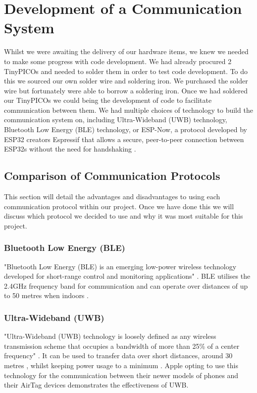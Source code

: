 {\section{Development of a Communication System}

Whilst we were awaiting the delivery of our hardware items, we knew we needed to make some progress with code development. We had already procured 2 TinyPICOs and needed to solder them in order to test code development. To do this we sourced our own solder wire and soldering iron. We purchased the solder wire but fortunately were able to borrow a soldering iron. Once we had soldered our TinyPICOs we could being the development of code to facilitate communication between them. We had multiple choices of technology to build the communication system on, including Ultra-Wideband (UWB) technology, Bluetooth Low Energy (BLE) technology, or ESP-Now, a protocol developed by ESP32 creators Espressif that allows a secure, peer-to-peer connection between ESP32s without the need for handshaking \cite{esp-now_overview}.

\subsection{Comparison of Communication Protocols}

This section will detail the advantages and disadvantages to using each communication protocol within our project. Once we have done this we will discuss which protocol we decided to use and why it was most suitable for this project.

\subsubsection{Bluetooth Low Energy (BLE)}

"Bluetooth Low Energy (BLE) is an emerging low-power wireless technology developed for short-range control and monitoring applications" \cite{gomez_oller_paradells_2012}. BLE utilises the 2.4GHz frequency band for communication and can operate over distances of up to 50 metres when indoors \cite{ble_adv_dis}.



\subsubsection{Ultra-Wideband (UWB)}

"Ultra-Wideband (UWB) technology is loosely defined as any wireless transmission scheme that occupies a bandwidth of more than 25\% of a center frequency" \cite{Foerster_ultra-widebandtechnology}. It can be used to transfer data over short distances, around 30 metres \cite{uwb_adv_dis}, whilst keeping power usage to a minimum \cite{uwb}. Apple opting to use this technology for the communication between their newer models of phones and their AirTag devices demonstrates the effectiveness of UWB.

}
